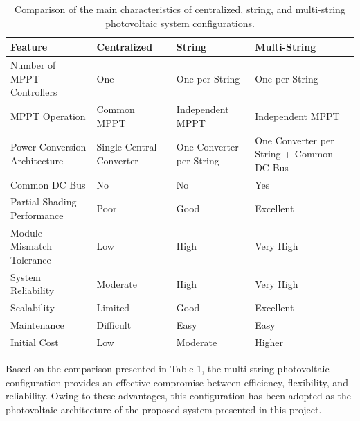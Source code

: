 \begin{table}[H]
    \centering
    \caption{Comparison of the main characteristics of centralized, string, and multi-string photovoltaic system configurations.}
    \label{tab:pv_configurations}
    \smallskip
    \smallskip
    \renewcommand{\arraystretch}{1.4} %
    
    \begin{tabularx}{\textwidth}{
        >{\hsize=1.4\hsize\raggedright\arraybackslash}X 
        >{\hsize=0.86\hsize\raggedright\arraybackslash}X 
        >{\hsize=0.86\hsize\raggedright\arraybackslash}X 
        >{\hsize=0.88\hsize\raggedright\arraybackslash}X
    }
        \toprule
        \textbf{Feature} & \textbf{Centralized} & \textbf{String} & \textbf{Multi-String} \\
        \midrule
        Number of MPPT Controllers & One & One per String & One per String \\
        MPPT Operation & Common MPPT & Independent MPPT & Independent MPPT \\
        Power Conversion Architecture & Single Central Converter & One Converter per String & One Converter per String + Common DC Bus \\
        Common DC Bus & No & No & Yes \\
        Partial Shading Performance & Poor & Good & Excellent \\
        Module Mismatch Tolerance & Low & High & Very High \\
        System Reliability & Moderate & High & Very High \\
        Scalability & Limited & Good & Excellent \\
        Maintenance & Difficult & Easy & Easy \\
        Initial Cost & Low & Moderate & Higher \\
        \bottomrule
    \end{tabularx}
\end{table}

Based on the comparison presented in Table 1, the multi-string photovoltaic configuration provides an effective compromise between efficiency, flexibility, and reliability. Owing to these advantages, this configuration has been adopted as the photovoltaic architecture of the proposed system presented in this project.

\newpage

